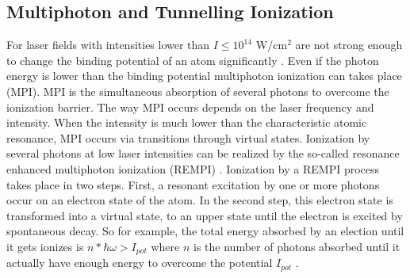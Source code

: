 %




\subsection{Multiphoton and Tunnelling Ionization}

For laser fields with intensities lower than $I \leq 10^{14}$ W/cm$^{2}$ are not strong enough to change the binding potential of an atom significantly \cite{rhodes_multiphoton_1985}. Even if the photon energy is lower than the binding potential multiphoton ionization can takes place (MPI).  MPI is the simultaneous absorption of several photons to overcome the ionization barrier. The way MPI occurs depends on the laser frequency and intensity. When the intensity is much lower than the characteristic atomic resonance, MPI occurs via transitions through virtual states. Ionization by several photons at low laser intensities can be realized by the so-called resonance enhanced multiphoton ionization (REMPI) \cite{mainfray_multiphoton_nodate}.  Ionization by a REMPI process takes place in two steps. First, a resonant excitation by one or more photons occur on an electron state of the atom. In the second step, this electron state is transformed into a virtual state, to an upper state until the electron is excited by spontaneous decay. So for example, the total energy absorbed by an election until it gets ionizes is $n * \hbar\omega > I_{pot}$ where $n$ is the number of photons absorbed until it actually have enough energy to overcome the potential $I_{pot}$ \cite{gruner_femtosekundenspektroskopie_2013}.

